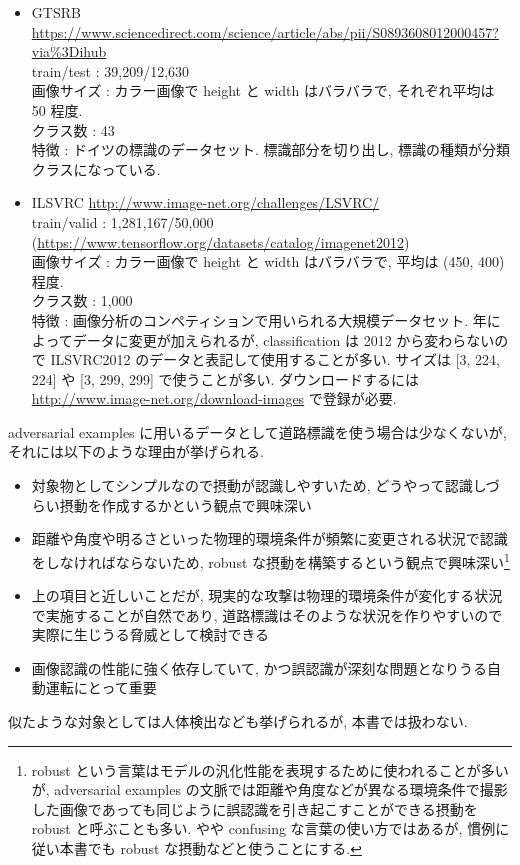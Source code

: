 \begin{itemize}
  \item GTSRB \href{https://www.sciencedirect.com/science/article/abs/pii/S0893608012000457?via\%3Dihub}{https://www.sciencedirect.com/science/article/abs/pii/S0893608012000457?via\%3Dihub}\\
  train/test : 39,209/12,630\\
  画像サイズ : カラー画像で height と width はバラバラで, それぞれ平均は 50 程度.\\
  クラス数 : 43\\
  特徴 : ドイツの標識のデータセット. 標識部分を切り出し, 標識の種類が分類クラスになっている.
  \item ILSVRC \href{http://www.image-net.org/challenges/LSVRC/}{http://www.image-net.org/challenges/LSVRC/}\\
  train/valid : 1,281,167/50,000 (\href{https://www.tensorflow.org/datasets/catalog/imagenet2012}{https://www.tensorflow.org/datasets/catalog/imagenet2012})\\
  画像サイズ : カラー画像で height と width はバラバラで, 平均は (450, 400) 程度.\\
  クラス数 : 1,000\\
  特徴 : 画像分析のコンペティションで用いられる大規模データセット. 年によってデータに変更が加えられるが, classification は 2012 から変わらないので ILSVRC2012 のデータと表記して使用することが多い. サイズは [3, 224, 224] や [3, 299, 299] で使うことが多い. ダウンロードするには \href{http://www.image-net.org/download-images}{http://www.image-net.org/download-images} で登録が必要.
\end{itemize}
%

adversarial examples に用いるデータとして道路標識を使う場合は少なくないが, それには以下のような理由が挙げられる.
%
\begin{itemize}
  \item 対象物としてシンプルなので摂動が認識しやすいため, どうやって認識しづらい摂動を作成するかという観点で興味深い
  \item 距離や角度や明るさといった物理的環境条件が頻繁に変更される状況で認識をしなければならないため, robust な摂動を構築するという観点で興味深い\footnote{
  robust という言葉はモデルの汎化性能を表現するために使われることが多いが, adversarial examples の文脈では距離や角度などが異なる環境条件で撮影した画像であっても同じように誤認識を引き起こすことができる摂動を robust と呼ぶことも多い.
  やや confusing な言葉の使い方ではあるが, 慣例に従い本書でも robust な摂動などと使うことにする.
  }
  \item 上の項目と近しいことだが, 現実的な攻撃は物理的環境条件が変化する状況で実施することが自然であり, 道路標識はそのような状況を作りやすいので実際に生じうる脅威として検討できる
  \item 画像認識の性能に強く依存していて, かつ誤認識が深刻な問題となりうる自動運転にとって重要
\end{itemize}
%
似たような対象としては人体検出なども挙げられるが, 本書では扱わない.

